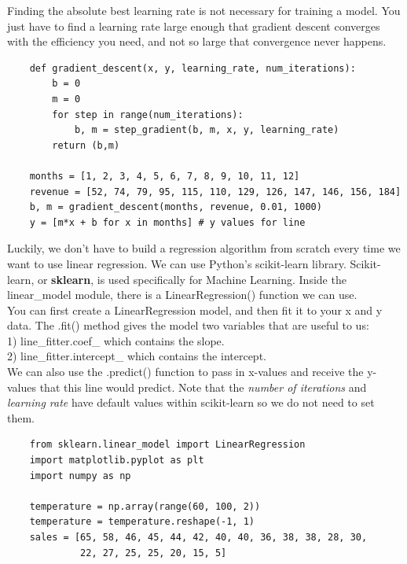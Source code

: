 \documentclass[11pt, a4paper]{article}
\begin{document}
\begin{spacing}{1.1}
	Finding the absolute best learning rate is not necessary for training a model. You just have to find a learning rate large enough that gradient descent converges with the efficiency you need, and not so large that convergence never happens. \vspace*{1mm}
	\begin{lstlisting}
	def gradient_descent(x, y, learning_rate, num_iterations):
		b = 0
		m = 0
		for step in range(num_iterations):
			b, m = step_gradient(b, m, x, y, learning_rate)
		return (b,m) 
	
	months = [1, 2, 3, 4, 5, 6, 7, 8, 9, 10, 11, 12]
	revenue = [52, 74, 79, 95, 115, 110, 129, 126, 147, 146, 156, 184]
	b, m = gradient_descent(months, revenue, 0.01, 1000)
	y = [m*x + b for x in months] # y values for line \end{lstlisting} \newpage

	\noindent Luckily, we don’t have to build a regression algorithm from scratch every time we want to use linear regression. We can use Python’s scikit-learn library. Scikit-learn, or \textbf{sklearn}, is used specifically for Machine Learning. Inside the linear\_model module, there is a LinearRegression() function we can use. \vspace*{1mm} \\
	You can first create a LinearRegression model, and then fit it to your x and y data. The .fit() method gives the model two variables that are useful to us: \vspace*{.5mm} \\	
	\hspace*{2mm} 1) line\_fitter.coef\_ which contains the slope. \\
	\hspace*{2mm} 2) line\_fitter.intercept\_ which contains the intercept. \vspace*{1.5mm} \\
	We can also use the .predict() function to pass in x-values and receive the y-values that this line would predict. Note that the \textit{number of iterations} and \textit{learning rate} have default values within scikit-learn so we do not need to set them.
	\begin{lstlisting}
	from sklearn.linear_model import LinearRegression
	import matplotlib.pyplot as plt
	import numpy as np
	
	temperature = np.array(range(60, 100, 2))
	temperature = temperature.reshape(-1, 1)
	sales = [65, 58, 46, 45, 44, 42, 40, 40, 36, 38, 38, 28, 30, 
	         22, 27, 25, 25, 20, 15, 5]
	

\end{lstlisting}
\end{spacing}
\end{document}
